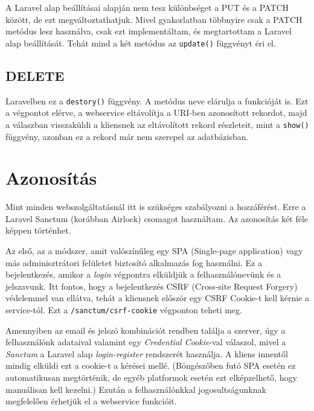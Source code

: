 \documentclass[a4paper,12pt]{thesis-ekf}
\theoremstyle{definition}
\begin{document}
				A Laravel alap beállításai alapján nem tesz különbséget a PUT és a PATCH között, de ezt megváltoztathatjuk. Mivel gyakorlatban többnyire csak a PATCH metódus lesz használva, csak ezt implementáltam, és megtartottam a Laravel alap beállítását. Tehát mind a két metódus az \verb|update()| függvényt éri el.
				
			\subsection{DELETE}
				Laravelben ez a \verb|destory()| függvény. A metódus neve elárulja a funkcióját is. Ezt a végpontot elérve, a webservice eltávolítja a URI-ben azonosított rekordot, majd a válaszban visszaküldi a kliensnek az eltávolított rekord részleteit, mint a \verb|show()| függvény, azonban ez a rekord már nem szerepel az adatbázisban.
		
		\section{Azonosítás}\label{sc-auth}
			Mint minden webszolgáltatásnál itt is szükséges szabályozni a hozzáférést. Erre a Laravel Sanctum (korábban Airlock) csomagot használtam. Az azonosítás két féle képpen történhet.
			
			Az első, az a módszer, amit valószínűleg egy SPA (Single-page application) vagy más adminisztrátori felületet biztosító alkalmazás fog használni. Ez a  bejelentkezés, amikor a \emph{login} végpontra elküldjük a felhasználónevünk és a jelszavunk. Itt fontos, hogy a bejelentkezés CSRF (Cross-site Request Forgery) védelemmel van ellátva, tehát a kliensnek először egy CSRF Cookie-t kell kérnie a service-tól. Ezt a \verb|/sanctum/csrf-cookie| végponton teheti meg. 
			
			Amennyiben az email és jelszó kombinációt rendben találja a szerver, úgy a felhasználónk adataival valamint egy \emph{Credential Cookie}-val válaszol, mivel a \emph{Sanctum} a Laravel alap \emph{login-register} rendszerét használja. A kliens innentől mindig elküldi ezt a cookie-t a kérései mellé. (Böngészőben futó SPA esetén ez automatikusan megtörténik, de egyéb platformok esetén ezt elképzelhető, hogy manuálisan kell kezelni.) Ezután a felhasználónkkal jogosultságunknak megfelelően érhetjük el a webservice funkcióit. 
			
\end{document}
